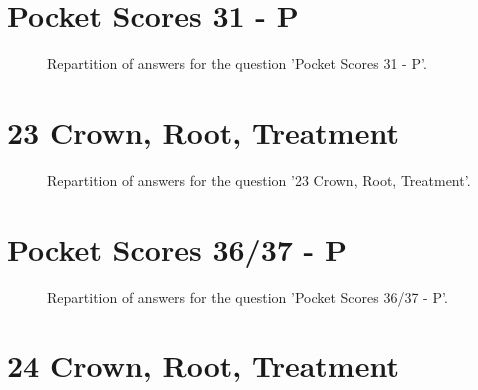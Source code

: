 \documentclass[12pt]{article}
\begin{document}
\clearpage{}
\section{Pocket Scores
31 - P}

\label{sec:67}


\begin{figure}[h!]
    \caption{\label{figure:q67-1}Repartition of answers for the question 'Pocket Scores
31 - P'.}
\end{figure}



\clearpage{}
\section{23
Crown, Root, Treatment}

\label{sec:35}


\begin{figure}[h!]
    \caption{\label{figure:q35-1}Repartition of answers for the question '23
Crown, Root, Treatment'.}
\end{figure}



\clearpage{}
\section{Pocket Scores
36/37 - P}

\label{sec:68}


\begin{figure}[h!]
    \caption{\label{figure:q68-1}Repartition of answers for the question 'Pocket Scores
36/37 - P'.}
\end{figure}



\clearpage{}
\section{24
Crown, Root, Treatment}
\end{document}
